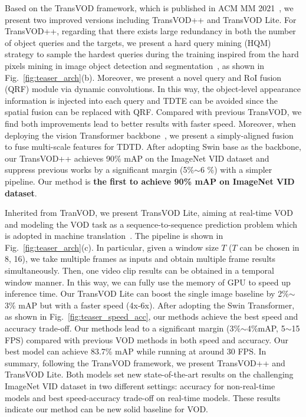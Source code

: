 \documentclass[10pt,journal,compsoc]{IEEEtran}
\begin{document}
Based on the TransVOD framework, which is published in ACM MM 2021~\cite{he2021end}, we present two improved versions including TransVOD++ and TransVOD Lite. For TransVOD++, regarding that 
there exists large redundancy in both the number of object queries and the targets, we present a hard query mining (HQM) strategy to sample the hardest queries during the training inspired from the hard pixels mining in image object detection and segmentation~\cite{FocalLoss,ohem,SegOHEM}, as shown in Fig.~\ref{fig:teaser_arch}(b). Moreover, we present a novel query and RoI fusion (QRF) module via dynamic convolutions. In this way, the object-level appearance information is injected into each query and TDTE can be avoided since the spatial fusion can be replaced with QRF. Compared with previous TransVOD, we find both improvements lead to better results with faster speed. Moreover, when deploying the vision Transformer backbone~\cite{liu2021swin}, we present a simply-aligned fusion to fuse multi-scale features for TDTD. After adopting Swin base as the backbone, our TransVOD++ achieves 90\% mAP on the ImageNet VID dataset and suppress previous works by a significant margin (5\%$\sim$6 \%) with a simpler pipeline. Our method is \textbf{the first to achieve 90\% mAP on ImageNet VID dataset}.

Inherited from TranVOD, we present TransVOD Lite, aiming at real-time VOD and modeling the VOD task as a sequence-to-sequence prediction problem which is adopted in machine translation~\cite{Vaswani17attention}. The pipeline is shown in Fig.~\ref{fig:teaser_arch}(c). In particular, given a window size $T$ ($T$ can be chosen in {8, 16}), we take multiple frames as inputs and obtain multiple frame results simultaneously. Then, one video clip results can be obtained in a temporal window manner. In this way, we can fully use the memory of GPU to speed up inference time. Our TransVOD Lite can boost the single image baseline by 2\%$\sim$3\% mAP but with a faster speed (4x-6x). After adopting the Swin Transformer, as shown in Fig.~\ref{fig:teaser_speed_acc}, our methods achieve the best speed and accuracy trade-off. Our methods lead to a significant margin (3\%$\sim$4\%mAP, 5$\sim$15 FPS) compared with previous VOD methods in both speed and accuracy. Our best model can achieve 83.7\% mAP while running at around 30 FPS. In summary, following the TransVOD framework, we present TransVOD++ and TransVOD Lite. Both models set new state-of-the-art results on the challenging ImageNet VID dataset in two different settings: accuracy for non-real-time models and best speed-accuracy trade-off on real-time models. These results indicate our method can be new solid baseline for VOD.
\end{document}
